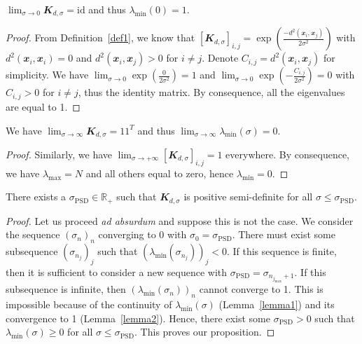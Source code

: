 \begin{lemma}
\label{lemma2}
$\lim_{\sigma \to 0} \mathbfit{K}_{d,\sigma} = \mathrm{id}$ and thus $\lambda_{\mathrm{min}}\left(0\right) = 1$.
\end{lemma}
\begin{proof}
From Definition~\ref{def1}, we know that $\left[ \mathbfit{K}_{d,\sigma} \right]_{i,j} = \exp\left( \tfrac{-d^2(\mathbfit{x}_i,\mathbfit{x}_j)}{2\sigma^2} \right)$ with $d^2(\mathbfit{x}_i,\mathbfit{x}_i)=0$ and $d^2(\mathbfit{x}_i,\mathbfit{x}_j)>0$ for $i\neq j$.  Denote $C_{i,j} = d^2(\mathbfit{x}_i,\mathbfit{x}_j)$ for simplicity. We have $\lim_{\sigma \to 0} \exp\left( \tfrac{0}{2\sigma^2} \right) = 1$ and $\lim_{\sigma \to 0} \exp\left(- \tfrac{C_{i,j}}{2\sigma^2} \right) = 0$ with $C_{i,j}>0$ for $i\neq j$, thus the identity matrix. By consequence, all the eigenvalues are equal to 1.
\end{proof}

\begin{lemma}
\label{lemma3}
We have 
$\lim_{\sigma \to \infty} \mathbfit{K}_{d,\sigma} = \mathbfit{1}\mathbfit{1}^T$ and thus $\lim_{\sigma \to \infty}\lambda_{\mathrm{min}}\left(\sigma\right) = 0$.
\end{lemma}
\begin{proof}
Similarly, we have $\lim_{\sigma \to +\infty} \left[ \mathbfit{K}_{d,\sigma} \right]_{i,j} = 1$ everywhere. By consequence, we have $\lambda_{\mathrm{max}}=N$ and all others equal to zero, hence $\lambda_{\mathrm{min}}=0$.
\end{proof}

\begin{proposition}
\label{existence-sigma}
There exists a $\sigma_{\mathrm{PSD}}\in \mathbb{R}_{+}$ such that $\mathbfit{K}_{d,\sigma}$ is positive semi-definite for all $\sigma \leq \sigma_{\mathrm{PSD}}$.
\end{proposition}
\begin{proof}
Let us proceed \emph{ad absurdum} and suppose this is not the case. We consider the sequence $\left( \sigma_n \right)_n$ converging to 0 with $\sigma_0 = \sigma_{\mathrm{PSD}}$. There must exist some subsequence $\left( \sigma_{n_j} \right)_j$ such that $\left( \lambda_{\mathrm{min}}\left(\sigma_{n_j}\right) \right)_j < 0$. If this sequence is finite, then it is sufficient to consider a new sequence with $\sigma_{\mathrm{PSD}} = \sigma_{n_{j_{\mathrm{max}}}+1}$. If this subsequence is infinite, then $\left( \lambda_{\mathrm{min}}\left(\sigma_{n}\right) \right)_n$ cannot converge to 1. This is impossible because of the continuity of $\lambda_{\mathrm{min}}\left( \sigma \right)$ (Lemma~\ref{lemma1}) and its convergence to 1 (Lemma~\ref{lemma2}). Hence, there exist 
some $\sigma_{\mathrm{PSD}}>0$ such that $\lambda_{\mathrm{min}}\left( \sigma \right)\geq 0$ for all $\sigma \leq \sigma_{\mathrm{PSD}}$. This proves our proposition.
\end{proof}

